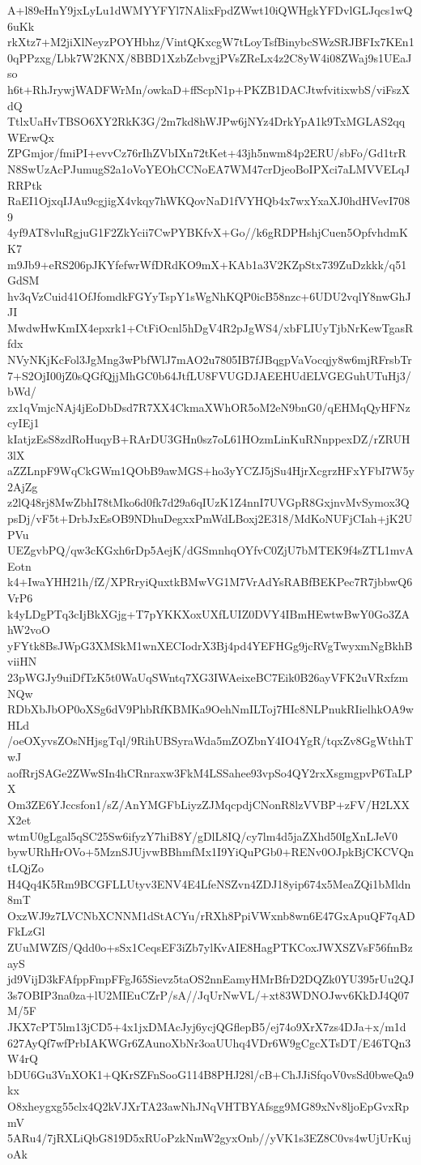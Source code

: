 A+l89eHnY9jxLyLu1dWMYYFYl7NAlixFpdZWwt10iQWHgkYFDvlGLJqcs1wQ6uKk
rkXtz7+M2jiXlNeyzPOYHbhz/VintQKxcgW7tLoyTsfBinybcSWzSRJBFIx7KEn1
0qPPzxg/Lbk7W2KNX/8BBD1XzbZcbvgjPVsZReLx4z2C8yW4i08ZWaj9s1UEaJso
h6t+RhJrywjWADFWrMn/owkaD+ffScpN1p+PKZB1DACJtwfvitixwbS/viFszXdQ
TtlxUaHvTBSO6XY2RkK3G/2m7kd8hWJPw6jNYz4DrkYpA1k9TxMGLAS2qqWErwQx
ZPGmjor/fmiPI+evvCz76rIhZVbIXn72tKet+43jh5nwm84p2ERU/sbFo/Gd1trR
N8SwUzAcPJumugS2a1oVoYEOhCCNoEA7WM47crDjeoBoIPXci7aLMVVELqJRRPtk
RaEI1OjxqIJAu9cgjigX4vkqy7hWKQovNaD1fVYHQb4x7wxYxaXJ0hdHVevI7089
4yf9AT8vluRgjuG1F2ZkYcii7CwPYBKfvX+Go//k6gRDPHshjCuen5OpfvhdmKK7
m9Jb9+eRS206pJKYfefwrWfDRdKO9mX+KAb1a3V2KZpStx739ZuDzkkk/q51GdSM
hv3qVzCuid41OfJfomdkFGYyTspY1sWgNhKQP0icB58nzc+6UDU2vqlY8nwGhJJI
MwdwHwKmIX4epxrk1+CtFiOcnl5hDgV4R2pJgWS4/xbFLIUyTjbNrKewTgasRfdx
NVyNKjKcFol3JgMng3wPbfWlJ7mAO2u7805IB7fJBqgpVaVocqjy8w6mjRFrsbTr
7+S2OjI00jZ0sQGfQjjMhGC0b64JtfLU8FVUGDJAEEHUdELVGEGuhUTuHj3/bWd/
zx1qVmjcNAj4jEoDbDsd7R7XX4CkmaXWhOR5oM2eN9bnG0/qEHMqQyHFNzcyIEj1
kIatjzEsS8zdRoHuqyB+RArDU3GHn0sz7oL61HOzmLinKuRNnppexDZ/rZRUH3lX
aZZLnpF9WqCkGWm1QObB9awMGS+ho3yYCZJ5jSu4HjrXcgrzHFxYFbI7W5y2AjZg
z2lQ48rj8MwZbhI78tMko6d0fk7d29a6qIUzK1Z4nnI7UVGpR8GxjnvMvSymox3Q
psDj/vF5t+DrbJxEsOB9NDhuDegxxPmWdLBoxj2E318/MdKoNUFjCIah+jK2UPVu
UEZgvbPQ/qw3cKGxh6rDp5AejK/dGSmnhqOYfvC0ZjU7bMTEK9f4sZTL1mvAEotn
k4+IwaYHH21h/fZ/XPRryiQuxtkBMwVG1M7VrAdYsRABfBEKPec7R7jbbwQ6VrP6
k4yLDgPTq3cIjBkXGjg+T7pYKKXoxUXfLUIZ0DVY4IBmHEwtwBwY0Go3ZAhW2voO
yFYtk8BsJWpG3XMSkM1wnXECIodrX3Bj4pd4YEFHGg9jcRVgTwyxmNgBkhBviiHN
23pWGJy9uiDfTzK5t0WaUqSWntq7XG3IWAeixeBC7Eik0B26ayVFK2uVRxfzmNQw
RDbXbJbOP0oXSg6dV9PhbRfKBMKa9OehNmILToj7HIc8NLPnukRIielhkOA9wHLd
/oeOXyvsZOsNHjsgTql/9RihUBSyraWda5mZOZbnY4IO4YgR/tqxZv8GgWthhTwJ
aofRrjSAGe2ZWwSIn4hCRnraxw3FkM4LSSahee93vpSo4QY2rxXsgmgpvP6TaLPX
Om3ZE6YJccsfon1/sZ/AnYMGFbLiyzZJMqcpdjCNonR8lzVVBP+zFV/H2LXXX2et
wtmU0gLgal5qSC25Sw6ifyzY7hiB8Y/gDlL8IQ/cy7lm4d5jaZXhd50IgXnLJeV0
bywURhHrOVo+5MznSJUjvwBBhmfMx1I9YiQuPGb0+RENv0OJpkBjCKCVQntLQjZo
H4Qq4K5Rm9BCGFLLUtyv3ENV4E4LfeNSZvn4ZDJ18yip674x5MeaZQi1bMldn8mT
OxzWJ9z7LVCNbXCNNM1dStACYu/rRXh8PpiVWxnb8wn6E47GxApuQF7qADFkLzGl
ZUuMWZfS/Qdd0o+sSx1CeqsEF3iZb7ylKvAIE8HagPTKCoxJWXSZVsF56fmBzayS
jd9VijD3kFAfppFmpFFgJ65Sievz5taOS2nnEamyHMrBfrD2DQZk0YU395rUu2QJ
3s7OBIP3na0za+lU2MIEuCZrP/sA//JqUrNwVL/+xt83WDNOJwv6KkDJ4Q07M/5F
JKX7cPT5lm13jCD5+4x1jxDMAcJyj6ycjQGflepB5/ej74o9XrX7zs4DJa+x/m1d
627AyQf7wfPrbIAKWGr6ZAunoXbNr3oaUUhq4VDr6W9gCgcXTsDT/E46TQn3W4rQ
bDU6Gu3VnXOK1+QKrSZFnSooG114B8PHJ28l/cB+ChJJiSfqoV0vsSd0bweQa9kx
O8xheygxg55clx4Q2kVJXrTA23awNhJNqVHTBYAfsgg9MG89xNv8ljoEpGvxRpmV
5ARu4/7jRXLiQbG819D5xRUoPzkNmW2gyxOnb//yVK1s3EZ8C0vs4wUjUrKujoAk
